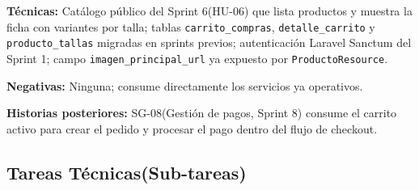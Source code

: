 \documentclass[12pt,a4paper]{article}
\begin{document}
\textbf{Técnicas:} Catálogo público del Sprint 6(HU-06) que lista productos y muestra la ficha con variantes por talla; tablas \texttt{carrito\_compras}, \texttt{detalle\_carrito} y \texttt{producto\_tallas} migradas en sprints previos; autenticación Laravel Sanctum del Sprint 1; campo \texttt{imagen\_principal\_url} ya expuesto por \texttt{ProductoResource}.

\textbf{Negativas:} Ninguna; consume directamente los servicios ya operativos.

\textbf{Historias posteriores:} SG-08(Gestión de pagos, Sprint 8) consume el carrito activo para crear el pedido y procesar el pago dentro del flujo de checkout.

\subsection*{Tareas Técnicas(Sub-tareas)}
\end{document}
